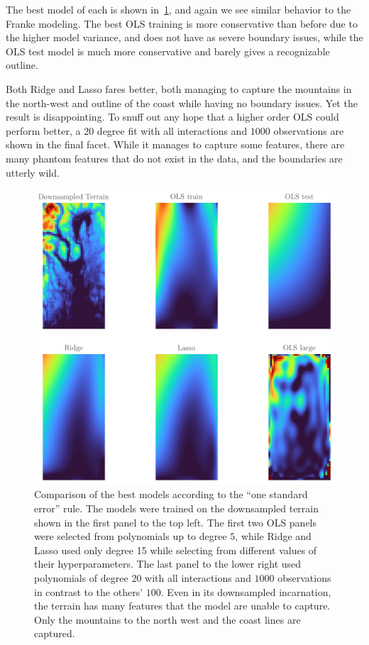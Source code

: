 The best model of each is shown in~\ref{fig:geocomp}, and again we see
similar behavior to the Franke modeling. The best OLS training is more
conservative than before due to the higher model variance, and does not have as severe boundary issues, while the OLS test
model is much more conservative and barely gives a recognizable outline. 

Both Ridge and Lasso fares better, both managing to capture the mountains in the
north-west and outline of the coast while having no boundary issues. Yet the
result is disappointing. To snuff out any hope that a higher order OLS could
perform better, a \(20\) degree fit with all interactions and \(1000\)
observations are shown in the final facet. While it manages to capture some
features, there are many phantom features that do not exist in the data, and the
boundaries are utterly wild.

\begin{figure}[b]
  \includegraphics[]{figures/geo_comp.png}
  \caption{\label{fig:geocomp} Comparison of the best models according
    to the ``one standard error'' rule. The models were trained on the
    downsampled terrain shown in the first panel to the top left. The first two
    OLS panels were selected from polynomials up to degree \(5\), while Ridge
    and Lasso used only degree 15 while selecting from different values of their
    hyperparameters. The last panel to the lower right used polynomials of
    degree 20 with all interactions and \(1000\) observations in contrast to the
  others' \(100\). Even in its downsampled incarnation, the terrain has many
  features that the model are unable to capture. Only the mountains to the north
west and the coast lines are captured.}
\end{figure}

